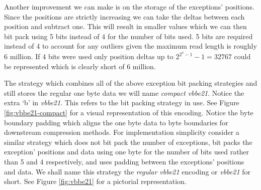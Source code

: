 

Another improvement we can make is on the storage of the exceptions' positions.
Since the positions are strictly increasing we can take the deltas between each
position and subtract one. This will result in smaller values which we can then
bit pack using 5 bits instead of 4 for the number of bits used.
5 bits are required instead of 4 to account for any outliers given the maximum
read length is roughly 6 million. If 4 bits were used only position deltas up to
$2^{2^{4}-1}-1=32767$ could be represented which is clearly short of 6 million.

The strategy which combines all of the above exception bit packing strategies
and still stores the regular one byte data we will name \textit{compact vbbe21}.
Notice the extra `b' in \textit{vbbe21}. This refers to the bit packing
strategy in use.
See Figure \ref{fig:vbbe21-compact} for a visual representation of this
encoding. Notice the byte boundary padding which aligns the one byte data to
byte boundaries for downstream compression methods. For implementation
simplicity consider a similar strategy which does not bit pack the number of
exceptions, bit packs the exception' positions and data using one byte for the
number of bits used rather than 5 and 4 respectively, and uses padding between
the exceptions' positions and data. We shall name this strategy the
\textit{regular vbbe21} encoding or \textit{vbbe21} for short. See Figure
\ref{fig:vbbe21} for a pictorial representation.





